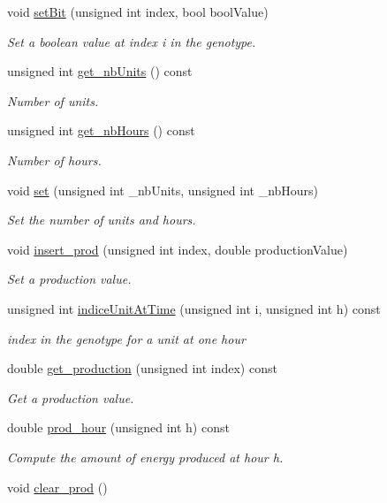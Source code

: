 \begin{DoxyCompactItemize}
void \hyperlink{classeo_u_c_p_a9a8fc590c925b85752c4384d135360d6}{set\-Bit} (unsigned int index, bool bool\-Value)
\begin{DoxyCompactList}\small\item\em \-Set a boolean value at index i in the genotype. \end{DoxyCompactList}\item 
unsigned int \hyperlink{classeo_u_c_p_a301be8475f6014e9a1dca71467c59654}{get\-\_\-nb\-Units} () const 
\begin{DoxyCompactList}\small\item\em \-Number of units. \end{DoxyCompactList}\item 
unsigned int \hyperlink{classeo_u_c_p_a378140f9807452ade10647afea55aae1}{get\-\_\-nb\-Hours} () const 
\begin{DoxyCompactList}\small\item\em \-Number of hours. \end{DoxyCompactList}\item 
void \hyperlink{classeo_u_c_p_a94ac1439c564d4df97928554cf98661c}{set} (unsigned int \-\_\-nb\-Units, unsigned int \-\_\-nb\-Hours)
\begin{DoxyCompactList}\small\item\em \-Set the number of units and hours. \end{DoxyCompactList}\item 
void \hyperlink{classeo_u_c_p_a60787002468cd77452b00b00c06143a6}{insert\-\_\-prod} (unsigned int index, double production\-Value)
\begin{DoxyCompactList}\small\item\em \-Set a production value. \end{DoxyCompactList}\item 
unsigned int \hyperlink{classeo_u_c_p_ad47816530947f5d556a64448c7f137d4}{indice\-Unit\-At\-Time} (unsigned int i, unsigned int h) const 
\begin{DoxyCompactList}\small\item\em index in the genotype for a unit at one hour \end{DoxyCompactList}\item 
double \hyperlink{classeo_u_c_p_a6d8ad26fdc735c9306afcc21940e051d}{get\-\_\-production} (unsigned int index) const 
\begin{DoxyCompactList}\small\item\em \-Get a production value. \end{DoxyCompactList}\item 
double \hyperlink{classeo_u_c_p_a324000ddbe617d11f17bc6f73539ff8a}{prod\-\_\-hour} (unsigned int h) const 
\begin{DoxyCompactList}\small\item\em \-Compute the amount of energy produced at hour h. \end{DoxyCompactList}\item 
\hypertarget{classeo_u_c_p_a390d63a3eef2b208c5c461d2be1cff8b}{void \hyperlink{classeo_u_c_p_a390d63a3eef2b208c5c461d2be1cff8b}{clear\-\_\-prod} ()}\label{classeo_u_c_p_a390d63a3eef2b208c5c461d2be1cff8b}


\end{DoxyCompactItemize}
